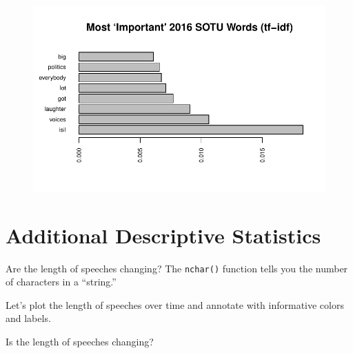 \documentclass[
  letterpaper,
  DIV=11,
  numbers=noendperiod]{scrreprt}
\newenvironment{Shaded}{\begin{snugshade}}{\end{snugshade}}
\newcommand{\FunctionTok}[1]{\textcolor[rgb]{0.28,0.35,0.67}{#1}}
\newcommand{\NormalTok}[1]{\textcolor[rgb]{0.00,0.23,0.31}{#1}}
\newcommand{\OtherTok}[1]{\textcolor[rgb]{0.00,0.23,0.31}{#1}}
\newcommand{\SpecialCharTok}[1]{\textcolor[rgb]{0.37,0.37,0.37}{#1}}
\begin{document}
\begin{figure}[H]

{\centering \includegraphics{11-TextasData_files/figure-pdf/unnamed-chunk-15-2.pdf}

}

\end{figure}

\hypertarget{additional-descriptive-statistics}{%
\section{Additional Descriptive
Statistics}\label{additional-descriptive-statistics}}

Are the length of speeches changing? The \texttt{nchar()} function tells
you the number of characters in a ``string.''

\begin{Shaded}
\end{Shaded}

Let's plot the length of speeches over time and annotate with
informative colors and labels.

Is the length of speeches changing?
\end{document}
